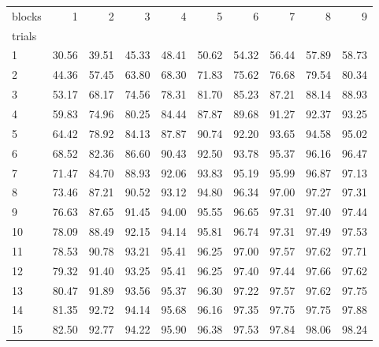 \begin{tabularx}{\textwidth}{@{}Xrrrrrrrrr@{}}
\toprule
blocks & 1 & 2 & 3 & 4 & 5 & 6 & 7 & 8 & 9 \\
trials &  &  &  &  &  &  &  &  &  \\
\midrule
1 & 30.56 & 39.51 & 45.33 & 48.41 & 50.62 & 54.32 & 56.44 & 57.89 & 58.73 \\
2 & 44.36 & 57.45 & 63.80 & 68.30 & 71.83 & 75.62 & 76.68 & 79.54 & 80.34 \\
3 & 53.17 & 68.17 & 74.56 & 78.31 & 81.70 & 85.23 & 87.21 & 88.14 & 88.93 \\
4 & 59.83 & 74.96 & 80.25 & 84.44 & 87.87 & 89.68 & 91.27 & 92.37 & 93.25 \\
5 & 64.42 & 78.92 & 84.13 & 87.87 & 90.74 & 92.20 & 93.65 & 94.58 & 95.02 \\
6 & 68.52 & 82.36 & 86.60 & 90.43 & 92.50 & 93.78 & 95.37 & 96.16 & 96.47 \\
7 & 71.47 & 84.70 & 88.93 & 92.06 & 93.83 & 95.19 & 95.99 & 96.87 & 97.13 \\
8 & 73.46 & 87.21 & 90.52 & 93.12 & 94.80 & 96.34 & 97.00 & 97.27 & 97.31 \\
9 & 76.63 & 87.65 & 91.45 & 94.00 & 95.55 & 96.65 & 97.31 & 97.40 & 97.44 \\
10 & 78.09 & 88.49 & 92.15 & 94.14 & 95.81 & 96.74 & 97.31 & 97.49 & 97.53 \\
11 & 78.53 & 90.78 & 93.21 & 95.41 & 96.25 & 97.00 & 97.57 & 97.62 & 97.71 \\
12 & 79.32 & 91.40 & 93.25 & 95.41 & 96.25 & 97.40 & 97.44 & 97.66 & 97.62 \\
13 & 80.47 & 91.89 & 93.56 & 95.37 & 96.30 & 97.22 & 97.57 & 97.62 & 97.75 \\
14 & 81.35 & 92.72 & 94.14 & 95.68 & 96.16 & 97.35 & 97.75 & 97.75 & 97.88 \\
15 & 82.50 & 92.77 & 94.22 & 95.90 & 96.38 & 97.53 & 97.84 & 98.06 & 98.24 \\
\bottomrule
\end{tabularx}
